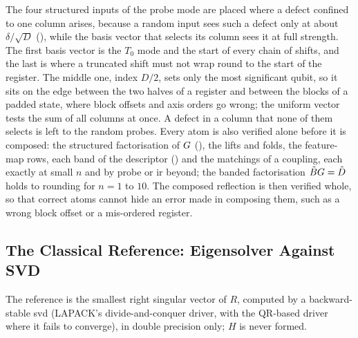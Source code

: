The four structured inputs of the probe mode are placed where a defect confined to one column arises, because a random input sees such a defect only at about $\delta/\sqrt D$ (), while the basis vector that selects its column sees it at full strength. The first basis vector is the $T_0$ mode and the start of every chain of shifts, and the last is where a truncated shift must not wrap round to the start of the register. The middle one, index $D/2$, sets only the most significant qubit, so it sits on the edge between the two halves of a register and between the blocks of a padded state, where block offsets and axis orders go wrong; the uniform vector tests the sum of all columns at once. A defect in a column that none of them selects is left to the random probes. Every atom is also verified alone before it is composed: the structured factorisation of $G$ (), the lifts and folds, the feature-map rows, each band of the descriptor () and the matchings of a coupling, each exactly at small $n$ and by probe or \gls{ir} beyond; the banded factorisation $\tilde{B}G=\tilde{D}$ holds to rounding for $n=1$ to $10$. The composed reflection is then verified whole, so that correct atoms cannot hide an error made in composing them, such as a wrong block offset or a mis-ordered register.

\subsection{The Classical Reference: Eigensolver Against SVD}
\label{app:eigh-vs-svd}

The reference is the smallest right singular vector of $R$, computed by a backward-stable \gls{svd} (LAPACK's divide-and-conquer driver, with the QR-based driver where it fails to converge), in double precision only; $H$ is never formed.

